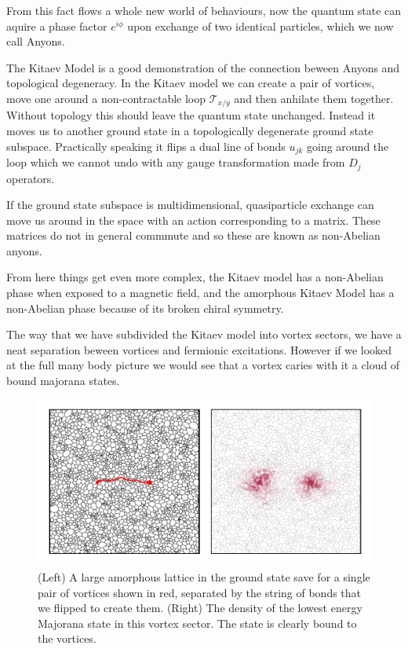 From this fact flows a whole new world of behaviours, now the quantum
state can aquire a phase factor \(e^{i\phi}\) upon exchange of two
identical particles, which we now call Anyons.

The Kitaev Model is a good demonstration of the connection beween Anyons
and topological degeneracy. In the Kitaev model we can create a pair of
vortices, move one around a non-contractable loop \(\mathcal{T}_{x/y}\)
and then anhilate them together. Without topology this should leave the
quantum state unchanged. Instead it moves us to another ground state in
a topologically degenerate ground state subspace. Practically speaking
it flips a dual line of bonds \(u_{jk}\) going around the loop which we
cannot undo with any gauge transformation made from \(D_j\) operators.

If the ground state subspace is multidimensional, quasiparticle exchange
can move us around in the space with an action corresponding to a
matrix. These matrices do not in general commmute and so these are known
as non-Abelian anyons.

From here things get even more complex, the Kitaev model has a
non-Abelian phase when exposed to a magnetic field, and the amorphous
Kitaev Model has a non-Abelian phase because of its broken chiral
symmetry.

The way that we have subdivided the Kitaev model into vortex sectors, we
have a neat separation beween vortices and fermionic excitations.
However if we looked at the full many body picture we would see that a
vortex caries with it a cloud of bound majorana states.

\begin{figure}
\hypertarget{fig:majorana_bound_states}{%
\centering
\includegraphics[width=1\textwidth,height=\textheight]{figure_code/amk_chapter/majorana_bound_states/majorana_bound_states.pdf}
\caption{(Left) A large amorphous lattice in the ground state save for a
single pair of vortices shown in red, separated by the string of bonds
that we flipped to create them. (Right) The density of the lowest energy
Majorana state in this vortex sector. The state is clearly bound to the
vortices.}\label{fig:majorana_bound_states}
}
\end{figure}

